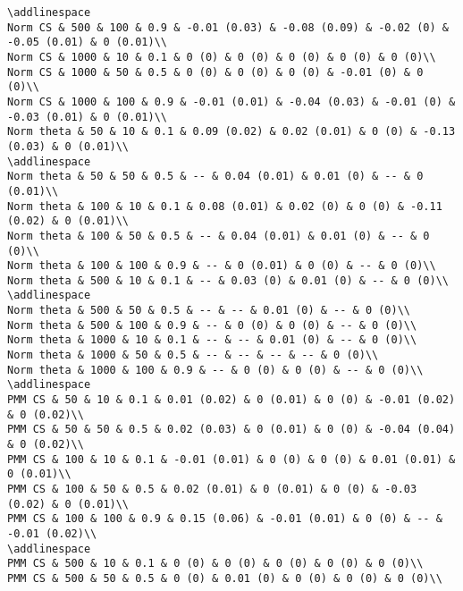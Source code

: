 \documentclass[
]{article}
\begin{document}
\begin{verbatim}
\addlinespace
Norm CS & 500 & 100 & 0.9 & -0.01 (0.03) & -0.08 (0.09) & -0.02 (0) & -0.05 (0.01) & 0 (0.01)\\
Norm CS & 1000 & 10 & 0.1 & 0 (0) & 0 (0) & 0 (0) & 0 (0) & 0 (0)\\
Norm CS & 1000 & 50 & 0.5 & 0 (0) & 0 (0) & 0 (0) & -0.01 (0) & 0 (0)\\
Norm CS & 1000 & 100 & 0.9 & -0.01 (0.01) & -0.04 (0.03) & -0.01 (0) & -0.03 (0.01) & 0 (0.01)\\
Norm theta & 50 & 10 & 0.1 & 0.09 (0.02) & 0.02 (0.01) & 0 (0) & -0.13 (0.03) & 0 (0.01)\\
\addlinespace
Norm theta & 50 & 50 & 0.5 & -- & 0.04 (0.01) & 0.01 (0) & -- & 0 (0.01)\\
Norm theta & 100 & 10 & 0.1 & 0.08 (0.01) & 0.02 (0) & 0 (0) & -0.11 (0.02) & 0 (0.01)\\
Norm theta & 100 & 50 & 0.5 & -- & 0.04 (0.01) & 0.01 (0) & -- & 0 (0)\\
Norm theta & 100 & 100 & 0.9 & -- & 0 (0.01) & 0 (0) & -- & 0 (0)\\
Norm theta & 500 & 10 & 0.1 & -- & 0.03 (0) & 0.01 (0) & -- & 0 (0)\\
\addlinespace
Norm theta & 500 & 50 & 0.5 & -- & -- & 0.01 (0) & -- & 0 (0)\\
Norm theta & 500 & 100 & 0.9 & -- & 0 (0) & 0 (0) & -- & 0 (0)\\
Norm theta & 1000 & 10 & 0.1 & -- & -- & 0.01 (0) & -- & 0 (0)\\
Norm theta & 1000 & 50 & 0.5 & -- & -- & -- & -- & 0 (0)\\
Norm theta & 1000 & 100 & 0.9 & -- & 0 (0) & 0 (0) & -- & 0 (0)\\
\addlinespace
PMM CS & 50 & 10 & 0.1 & 0.01 (0.02) & 0 (0.01) & 0 (0) & -0.01 (0.02) & 0 (0.02)\\
PMM CS & 50 & 50 & 0.5 & 0.02 (0.03) & 0 (0.01) & 0 (0) & -0.04 (0.04) & 0 (0.02)\\
PMM CS & 100 & 10 & 0.1 & -0.01 (0.01) & 0 (0) & 0 (0) & 0.01 (0.01) & 0 (0.01)\\
PMM CS & 100 & 50 & 0.5 & 0.02 (0.01) & 0 (0.01) & 0 (0) & -0.03 (0.02) & 0 (0.01)\\
PMM CS & 100 & 100 & 0.9 & 0.15 (0.06) & -0.01 (0.01) & 0 (0) & -- & -0.01 (0.02)\\
\addlinespace
PMM CS & 500 & 10 & 0.1 & 0 (0) & 0 (0) & 0 (0) & 0 (0) & 0 (0)\\
PMM CS & 500 & 50 & 0.5 & 0 (0) & 0.01 (0) & 0 (0) & 0 (0) & 0 (0)\\

\end{verbatim}
\end{document}
